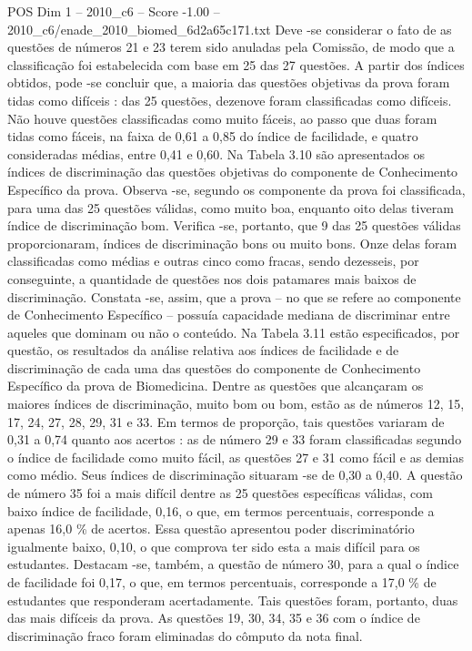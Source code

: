 \begin{textsample}{POS Dim 1 – 2010\_c6 – Score -1.00 – 2010\_c6/enade\_2010\_biomed\_6d2a65c171.txt}
Deve -se considerar o fato de as questões de números 21 e 23 terem sido anuladas pela Comissão, de modo que a classificação foi estabelecida com base em 25 das 27 questões.
A partir dos índices obtidos, pode -se concluir que, a maioria das questões objetivas da prova foram tidas como difíceis : das 25 questões, dezenove foram classificadas como difíceis.
Não houve questões classificadas como muito fáceis, ao passo que duas foram tidas como fáceis, na faixa de 0,61 a 0,85 do índice de facilidade, e quatro consideradas médias, entre 0,41 e 0,60.
Na Tabela 3.10 são apresentados os índices de discriminação das questões objetivas do componente de Conhecimento Específico da prova.
Observa -se, segundo os componente da prova foi classificada, para uma das 25 questões válidas, como muito boa, enquanto oito delas tiveram índice de discriminação bom.
Verifica -se, portanto, que 9 das 25 questões válidas proporcionaram, índices de discriminação bons ou muito bons.
Onze delas foram classificadas como médias e outras cinco como fracas, sendo dezesseis, por conseguinte, a quantidade de questões nos dois patamares mais baixos de discriminação.
Constata -se, assim, que a prova – no que se refere ao componente de Conhecimento Específico – possuía capacidade mediana de discriminar entre aqueles que dominam ou não o conteúdo.
Na Tabela 3.11 estão especificados, por questão, os resultados da análise relativa aos índices de facilidade e de discriminação de cada uma das questões do componente de Conhecimento Específico da prova de Biomedicina.
Dentre as questões que alcançaram os maiores índices de discriminação, muito bom ou bom, estão as de números 12, 15, 17, 24, 27, 28, 29, 31 e 33.
Em termos de proporção, tais questões variaram de 0,31 a 0,74 quanto aos acertos : as de número 29 e 33 foram classificadas segundo o índice de facilidade como muito fácil, as questões 27 e 31 como fácil e as demias como médio.
Seus índices de discriminação situaram -se de 0,30 a 0,40.
A questão de número 35 foi a mais difícil dentre as 25 questões específicas válidas, com baixo índice de facilidade, 0,16, o que, em termos percentuais, corresponde a apenas 16,0 \% de acertos.
Essa questão apresentou poder discriminatório igualmente baixo, 0,10, o que comprova ter sido esta a mais difícil para os estudantes.
Destacam -se, também, a questão de número 30, para a qual o índice de facilidade foi 0,17, o que, em termos percentuais, corresponde a 17,0 \% de estudantes que responderam acertadamente.
Tais questões foram, portanto, duas das mais difíceis da prova.
As questões 19, 30, 34, 35 e 36 com o índice de discriminação fraco foram eliminadas do cômputo da nota final.

\end{textsample}

